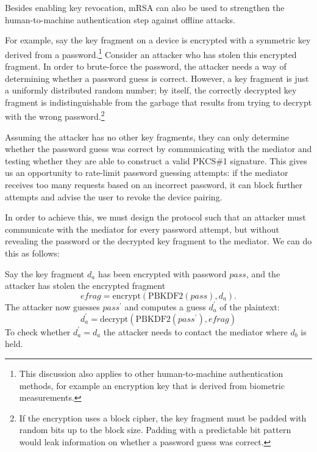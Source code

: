 Besides enabling key revocation, mRSA can also be used to strengthen the human-to-machine
authentication step against offline attacks.

For example, say the key fragment on a device is encrypted with a symmetric key derived from a
password.\footnote{This discussion also applies to other human-to-machine authentication methods,
for example an encryption key that is derived from biometric measurements.} Consider an attacker who
has stolen this encrypted fragment. In order to brute-force the password, the attacker needs a way
of determining whether a password guess is correct. However, a key fragment is just a uniformly
distributed random number; by itself, the correctly decrypted key fragment is indistinguishable from
the garbage that results from trying to decrypt with the wrong password.\footnote{If the encryption
uses a block cipher, the key fragment must be padded with random bits up to the block size. Padding
with a predictable bit pattern would leak information on whether a password guess was correct.}

Assuming the attacker has no other key fragments, they can only determine whether the password guess
was correct by communicating with the mediator and testing whether they are able to construct a
valid PKCS\#1 signature. This gives us an opportunity to rate-limit password guessing attempts: if
the mediator receives too many requests based on an incorrect password, it can block further
attempts and advise the user to revoke the device pairing.

In order to achieve this, we must design the protocol such that an attacker must communicate with
the mediator for every password attempt, but without revealing the password or the decrypted key
fragment to the mediator. We can do this as follows:

Say the key fragment $d_a$ has been encrypted with password $\mathit{pass}$, and the attacker has
stolen the encrypted fragment
$$\mathit{efrag} = \mathrm{encrypt}(\mathrm{PBKDF2}(\mathit{pass}), d_a).$$
The attacker now guesses $\mathit{pass}^\prime$ and computes a guess $d_a^\prime$ of the plaintext:
$$d_a^\prime = \mathrm{decrypt}(\mathrm{PBKDF2}(\mathit{pass}^\prime), \mathit{efrag})$$
To check whether $d_a^\prime = d_a$ the attacker needs to contact the mediator where $d_b$ is held.

